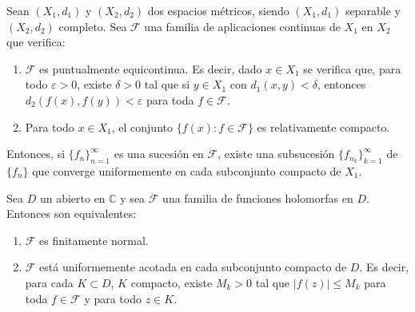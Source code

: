 \begin{theorem}
    Sean $(X_1, d_1)$ y $(X_2, d_2)$ dos espacios métricos, siendo $(X_1, d_1)$ separable y $(X_2, d_2)$ completo.
    Sea $\mathcal{F}$ una familia de aplicaciones continuas de $X_1$ en $X_2$ que verifica:
    \begin{enumerate}
        \item $\mathcal{F}$ es puntualmente equicontinua.
              Es decir, dado $x \in X_1$ se verifica que, para todo $\varepsilon > 0$, existe $\delta > 0$ tal que si $y \in X_1$ con $d_1(x, y) < \delta$, entonces $d_2(f(x), f(y)) < \varepsilon$ para toda $f \in \mathcal{F}$.
        \item Para todo $x \in X_1$, el conjunto $\{f(x) : f \in \mathcal{F}\}$ es relativamente compacto.
    \end{enumerate}
    Entonces, si $\{f_n\}_{n=1}^\infty$ es una sucesión en $\mathcal{F}$, existe una subsucesión $\{f_{n_k}\}_{k=1}^\infty$ de $\{f_n\}$ que converge uniformemente en cada subconjunto compacto de $X_1$.
\end{theorem}

\begin{theorem}
    Sea $D$ un abierto en $\mathbb{C}$ y sea $\mathcal{F}$ una familia de funciones holomorfas en $D$.
    Entonces son equivalentes:
    \begin{enumerate}
        \item $\mathcal{F}$ es finitamente normal.
        \item $\mathcal{F}$ está uniformemente acotada en cada subconjunto compacto de $D$.
              Es decir, para cada $K \subset D$, $K$ compacto, existe $M_k > 0$ tal que $|f(z)| \leq M_k$ para toda $f \in \mathcal{F}$ y para todo $z \in K$.
    \end{enumerate}
\end{theorem}


